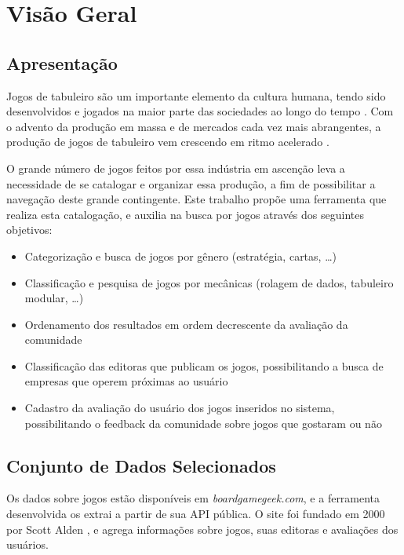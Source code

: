 \documentclass[hidelinks,article,twocolumn,brazil]{abntex2}
\def\bgg{\textit{boardgamegeek.com}}
\begin{document}
\imprimircapa

\section{Visão Geral}

\subsection{Apresentação}

Jogos de tabuleiro são um importante elemento da cultura humana, tendo sido desenvolvidos e jogados na maior parte das sociedades ao longo do tempo \cite{livingstone2019board}. Com o advento da produção em massa e de mercados cada vez mais abrangentes, a produção de jogos de tabuleiro vem crescendo em ritmo acelerado \cite{quinns2012youtube}.

O grande número de jogos feitos por essa indústria em ascenção leva a necessidade de se catalogar e organizar essa produção, a fim de possibilitar a navegação deste grande contingente. Este trabalho propõe uma ferramenta que realiza esta catalogação, e auxilia na busca por jogos através dos seguintes objetivos:
\begin{itemize}
    \item Categorização e busca de jogos por gênero (estratégia, cartas, \ldots)
    \item Classificação e pesquisa de jogos por mecânicas (rolagem de dados, tabuleiro modular, \ldots)
    \item Ordenamento dos resultados em ordem decrescente da avaliação da comunidade
    \item Classificação das editoras que publicam os jogos, possibilitando a busca de empresas que operem próximas ao usuário
    \item Cadastro da avaliação do usuário dos jogos inseridos no sistema, possibilitando o feedback da comunidade sobre jogos que gostaram ou não
\end{itemize}

\subsection{Conjunto de Dados Selecionados}

Os dados sobre jogos estão disponíveis em \bgg, e a ferramenta desenvolvida os extrai a partir de sua API pública. O site foi fundado em 2000 por Scott Alden \cite{woods2012eurogames}, e agrega informações sobre jogos, suas editoras e avaliações dos usuários.
\end{document}
